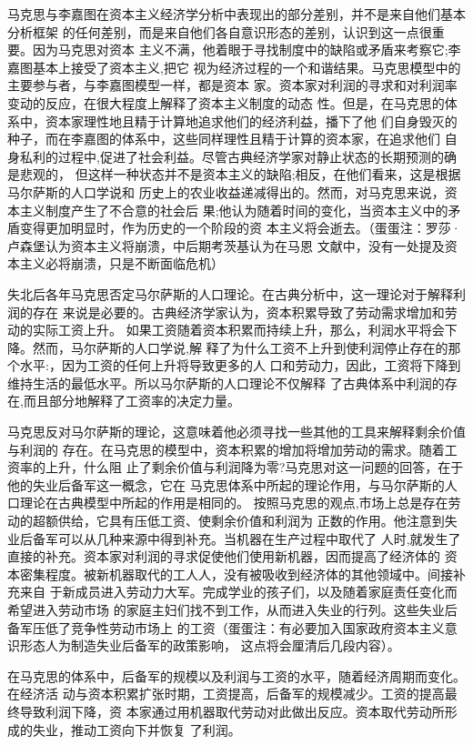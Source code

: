 马克思与李嘉图在资本主义经济学分析中表现出的部分差别，并不是来自他们基本分析框架
的任何差别，而是来自他们各自意识形态的差别，认识到这一点很重要。因为马克思对资本
主义不满，他着眼于寻找制度中的缺陷或矛盾来考察它;李嘉图基本上接受了资本主义,把它
视为经济过程的一个和谐结果。马克思模型中的主要参与者，与李嘉图模型一样，都是资本
家。资本家对利润的寻求和对利润率变动的反应，在很大程度上解释了资本主义制度的动态
性。但是，在马克思的体系中，资本家理性地且精于计算地追求他们的经济利益，播下了他
们自身毁灭的种子，而在李嘉图的体系中，这些同样理性且精于计算的资本家，在追求他们
自身私利的过程中,促进了社会利益。尽管古典经济学家对静止状态的长期预测的确是悲观的，
但这样一种状态并不是资本主义的缺陷;相反，在他们看来，这是根据马尔萨斯的人口学说和
历史上的农业收益递减得出的。然而，对马克思来说，资本主义制度产生了不合意的社会后
果;他认为随着时间的变化，当资本主义中的矛盾变得更加明显时，作为历史的一个阶段的资
本主义将会逝去。（蛋蛋注：罗莎·卢森堡认为资本主义将崩溃，中后期考茨基认为在马恩
文献中，没有一处提及资本主义必将崩溃，只是不断面临危机）

失北后各年马克思否定马尔萨斯的人口理论。在古典分析中，这一理论对于解释利润的存在
来说是必要的。古典经济学家认为，资本积累导致了劳动需求增加和劳动的实际工资上升。
如果工资随着资本积累而持续上升，那么，利润水平将会下降。然而，马尔萨斯的人口学说,解
释了为什么工资不上升到使利润停止存在的那个水平:，因为工资的任何上升将导致更多的人
口和劳动力，因此，工资将下降到维持生活的最低水平。所以马尔萨斯的人口理论不仅解释
了古典体系中利润的存在,而且部分地解释了工资率的决定力量。

马克思反对马尔萨斯的理论，这意味着他必须寻找一些其他的工具来解释剩余价值与利润的
存在。在马克思的模型中，资本积累的增加将增加劳动的需求。随着工资率的上升，什么阻
止了剩余价值与利润降为零?马克思对这一问题的回答，在于他的失业后备军这一概念，它在
马克思体系中所起的理论作用，与马尔萨斯的人口理论在古典模型中所起的作用是相同的。
按照马克思的观点,市场上总是存在劳动的超额供给，它具有压低工资、使剩余价值和利润为
正数的作用。他注意到失业后备军可以从几种来源中得到补充。当机器在生产过程中取代了
人时,就发生了直接的补充。资本家对利润的寻求促使他们使用新机器，因而提高了经济体的
资本密集程度。被新机器取代的工人人，没有被吸收到经济体的其他领域中。间接补充来自
于新成员进入劳动力大军。完成学业的孩子们，以及随着家庭责任变化而希望进入劳动市场
的家庭主妇们找不到工作，从而进入失业的行列。这些失业后备军压低了竞争性劳动市场上
的工资（蛋蛋注：有必要加入国家政府资本主义意识形态人为制造失业后备军的政策影响，
这点将会厘清后几段内容）。

在马克思的体系中，后备军的规模以及利润与工资的水平，随着经济周期而变化。在经济活
动与资本积累扩张时期，工资提高，后备军的规模减少。工资的提高最终导致利润下降，资
本家通过用机器取代劳动对此做出反应。资本取代劳动所形成的失业，推动工资向下并恢复
了利润。

